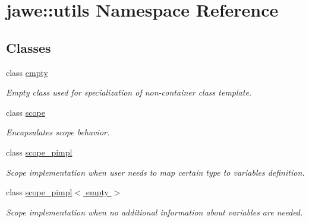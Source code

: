\hypertarget{namespacejawe_1_1utils}{}\section{jawe\+:\+:utils Namespace Reference}
\label{namespacejawe_1_1utils}
\subsection*{Classes}
\begin{DoxyCompactItemize}
\item 
class \hyperlink{classjawe_1_1utils_1_1empty}{empty}
\begin{DoxyCompactList}\small\item\em Empty class used for specialization of non-\/container class template. \end{DoxyCompactList}\item 
class \hyperlink{classjawe_1_1utils_1_1scope}{scope}
\begin{DoxyCompactList}\small\item\em Encapsulates scope behavior. \end{DoxyCompactList}\item 
class \hyperlink{classjawe_1_1utils_1_1scope__pimpl}{scope\+\_\+pimpl}
\begin{DoxyCompactList}\small\item\em Scope implementation when user needs to map certain type to variable\textquotesingle{}s definition. \end{DoxyCompactList}\item 
class \hyperlink{classjawe_1_1utils_1_1scope__pimpl_3_01empty_01_4}{scope\+\_\+pimpl$<$ empty $>$}
\begin{DoxyCompactList}\small\item\em Scope implementation when no additional information about variables are needed. \end{DoxyCompactList}\end{DoxyCompactItemize}
